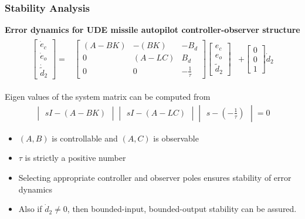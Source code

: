 \documentclass[table,10pt,red]{beamer}	%
\begin{document}
\begin{frame}
\frametitle{Stability Analysis}

\textbf{Error dynamics for UDE missile autopilot controller-observer structure}
\begin{eqnarray*}
\begin{aligned}
\begin{bmatrix}
\dot{e}_c \\
\dot{e}_o \\
\dot{\tilde{d}}_2
\end{bmatrix} =& 
\begin{bmatrix}
(A - BK) & -(BK) & -B_d \\
0 & (A - LC) & B_d \\
0 & 0 & -\frac{1}{\tau}
\end{bmatrix}
\begin{bmatrix}
e_c \\
e_o \\
\tilde{d}_2
\end{bmatrix}	
& + 
\begin{bmatrix}
0 \\
0 \\
1
\end{bmatrix} \dot{d}_2 \label{sr8}
\end{aligned}
\end{eqnarray*}

Eigen values of the system matrix can be computed from
\begin{eqnarray*}
\begin{vmatrix}
sI - (A - BK)
\end{vmatrix}
\begin{vmatrix}
sI - (A - LC)
\end{vmatrix}
\begin{vmatrix}
s - (-\frac{1}{\tau})
\end{vmatrix} = 0 \label{sr9}
\end{eqnarray*}

\begin{itemize}
	\item $(A, B)$ is controllable and $(A, C)$ is observable
	\item $\tau$ is strictly a positive number
	\item Selecting appropriate controller and observer poles ensures stability of error dynamics
	\item Also if $\dot{d}_2 \ne 0$, then bounded-input, bounded-output stability can be assured. 
\end{itemize}


\end{frame}
\end{document}
